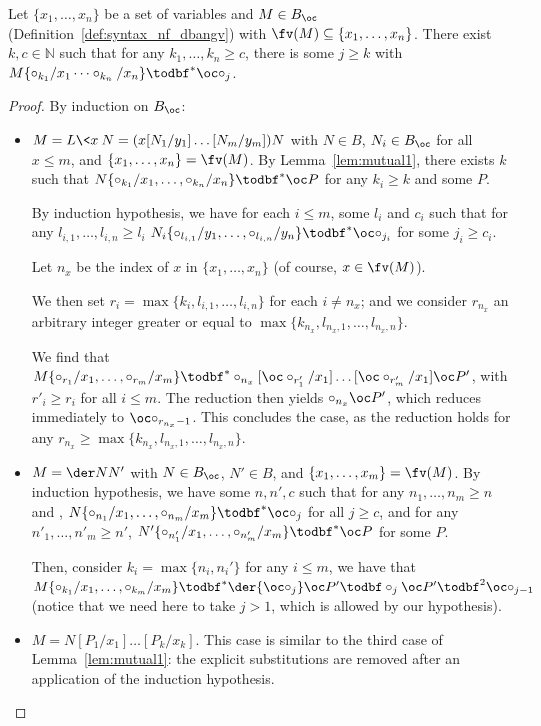 \begin{lemma}
\label{lem:mutual2}
	Let $\{x_1,\dots ,x_n\}$ be a set of variables and $M\in B_\oc$
	(Definition~\ref{def:syntax_nf_dbangv}) with
	$\fv(M)\subseteq\{x_1,\dots ,x_n\}$. There exist $k,c\in\mathbb N$ such
	that for any $k_1,\dots ,k_n\geq c$, there is some $j\geq k$ with
	$M\{\circ_{k_1}/x_1\dots \circ_{k_n}/x_n\}\todbf^* \oc \circ_j$. 
\end{lemma}
\begin{proof}
	By induction on $B_\oc$:
	\begin{itemize}
		\item $M=L\<x\>N=(x[N_1/y_1]\dots [N_m/y_m])N$ with $N\in B$, $N_i\in
			B_\oc$ for all $x\leq m$, and $\{x_1,\dots ,x_n\}=\fv(M)$. By
			Lemma~\ref{lem:mutual1}, there
			exists $k$ such that
			$N\{\circ_{k_1}/x_1,\dots ,\circ_{k_n}/x_n\}\todbf^* \oc P$ for
			any $k_i\geq k$ and some $P$. 
			
			By induction hypothesis, we have for each $i\leq m$,
			some $l_i$ and $c_i$ such that for any $l_{i,1},\dots ,l_{i,n}\geq l_i$
			$N_i \{\circ_{l_{i,1}}/y_1,\dots ,\circ_{l_{i,n}}/y_n\}\todbf^*
			\oc\circ_{j_i}$ for some $j_i\geq c_i$.

			Let $n_x$ be the index of $x$ in
			$\{x_1,\dots ,x_n\}$ (of course, $x\in\fv(M)$).

			We then
			set $r_i=\max\{k_i,
			l_{i,1},\dots ,l_{i,n}\}$ for each $i\neq n_x$; and we
			consider $r_{n_x}$ an arbitrary integer greater or equal
			to $\max\{k_{n_x},l_{n_x,1},\dots ,l_{n_x,n}\}$.
			
			We find 
			that $M\{\circ_{r_1}/x_1,\dots ,\circ_{r_m}/x_m\}\todbf^*
			\circ_{n_x}[\oc\circ_{r_1'}/x_1]\dots [\oc\circ_{r_m'}/x_1]\oc
			P'$, with $r'_i\geq
			r_i$ for all $i\leq m$. The reduction then yields 
			$\circ_{n_x}\oc P'$, which reduces immediately to $\oc
			\circ_{r_{n_x}-1}$. This concludes the case, as the
			reduction holds for any
			$r_{n_x}\geq\max\{k_{n_x},l_{n_x,1},\dots ,l_{n_x,n}\}$.
			
		\item $M=\der N N'$ with $N\in B_\oc$, $N'\in B$, and
			$\{x_1,\dots ,x_m\}=\fv(M)$. By induction
			hypothesis, we have some $n, n',c$ such that for any
			$n_1,\dots ,n_m\geq n$ and ,
			$N\{\circ_{n_1}/x_1,\dots ,\circ_{n_m}/x_m\}\todbf^*\oc\circ_j$ for
			all $j\geq c$, and for any $n'_1,\dots ,n'_m\geq n'$,
			$N'\{\circ_{n'_1}/x_1,\dots ,\circ_{n'_m}/x_m\}\todbf^*\oc P$
			for some $P$.

			Then, consider $k_i=\max\{n_i,n_i'\}$ for any $i\leq m$,
			we have that
			$M\{\circ_{k_1}/x_1,\dots ,\circ_{k_m}/x_m\}\todbf^* \der{\oc
			\circ_j}\oc P'\todbf \circ_j\oc P'\todbf^2\oc\circ_{j-1}$
			(notice that we need here to take $j>1$, which is
			allowed by our hypothesis).
		\item $M=N[P_1/x_1]\dots [P_k/x_k]$. This case is similar to the third case of
			Lemma~\ref{lem:mutual1}: the explicit substitutions are
			removed after an application of the induction
			hypothesis. \qedhere
	\end{itemize}
\end{proof}


